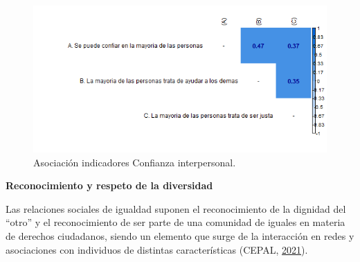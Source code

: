 \documentclass[
  12pt,
]{book}
\begin{document}
\begin{figure}[H]

{\centering \includegraphics[width=1\linewidth,height=1\textheight]{output/graphs/confianza-interpersonal_cor} 

}

\caption{Asociación indicadores Confianza interpersonal.}\label{fig:confianza-interpersonal-cor}
\end{figure}

\textbf{Reconocimiento y respeto de la diversidad}

Las relaciones sociales de igualdad suponen el reconocimiento de la dignidad del ``otro'' y el reconocimiento de ser parte de una comunidad de iguales en materia de derechos ciudadanos, siendo un elemento que surge de la interacción en redes y asociaciones con individuos de distintas características (CEPAL, \protect\hyperlink{ref-cepal_cohesion_2021}{2021}).
\end{document}
